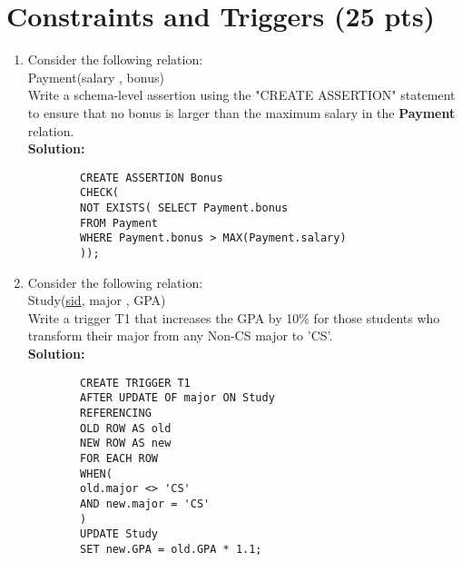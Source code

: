 \documentclass[paper=a4, fontsize=11pt]{scrartcl}
\numberwithin{equation}{section}		%
\numberwithin{figure}{section}			%
\numberwithin{table}{section}				%
\begin{document}
	\section{Constraints and Triggers (25 pts)}
	\begin{enumerate}
		\item Consider the following relation: \\
		Payment(salary , bonus) \\
		Write a schema-level assertion using the "CREATE ASSERTION" statement to ensure that no bonus is larger than the maximum salary in the \textbf{Payment} relation.\\
		\textbf{Solution: }
		\begin{lstlisting}
		CREATE ASSERTION Bonus
		CHECK(
		NOT EXISTS( SELECT Payment.bonus
		FROM Payment 
		WHERE Payment.bonus > MAX(Payment.salary)
		));
		\end{lstlisting}
		
		\item Consider the following relation: \\
		Study(\underline{sid}, major , GPA) \\
		Write a trigger T1 that increases the GPA by 10\% for those students who transform their major from any Non-CS major to 'CS'.\\
		\textbf{Solution: }
		\begin{lstlisting}
		CREATE TRIGGER T1
		AFTER UPDATE OF major ON Study
		REFERENCING
		OLD ROW AS old
		NEW ROW AS new
		FOR EACH ROW
		WHEN(
		old.major <> 'CS'
		AND new.major = 'CS'
		)
		UPDATE Study
		SET new.GPA = old.GPA * 1.1;
		
		
		\end{lstlisting}
		
		
		
	\end{enumerate}
	
	
	
	
	
\end{document}
